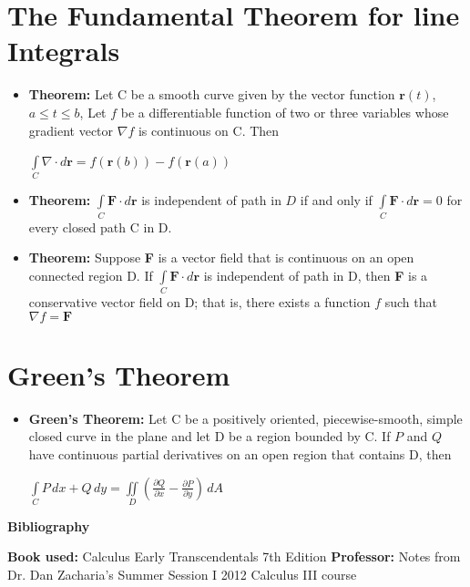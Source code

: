 \documentclass{report}
\begin{document}
	\section{The Fundamental Theorem for line Integrals}
		\begin{itemize}\addtolength{\leftskip}{2em}
			\item \textbf{Theorem:} Let C be a smooth curve given by the vector function $\textbf{r}(t)$, $a\le t \le b$, Let $f$ be a differentiable function of two or three variables whose gradient vector $\nabla f$ is continuous on C. Then
			\begin{center}
			$\int\limits_{C}^{}\nabla\cdot d\textbf{r}=f(\textbf{r}(b))-f(\textbf{r}(a))$
			\end{center}
			\item \textbf{Theorem:} $\int\limits_{C}^{}\textbf{F}\cdot d\textbf{r}$ is independent of path in $D$ if and only if $\int\limits_{C}^{}\textbf{F}\cdot d\textbf{r}=0$ for every closed path C in D.
			\item \textbf{Theorem:} Suppose \textbf{F} is a vector field that is continuous on an open connected region D. If $\int\limits_{C}^{}\textbf{F}\cdot d\textbf{r}$ is independent of path in D, then \textbf{F} is a conservative vector field on D;  that is, there exists a function $f$ such that $\nabla f=\textbf{F}$
		\end{itemize}
	\section{Green's Theorem}
		\begin{itemize}\addtolength{\leftskip}{2em}
			\item \textbf{Green's Theorem:} Let C be a positively oriented, piecewise-smooth, simple closed curve in the plane and let D be a region bounded by C. If $P$ and $Q$ have continuous partial derivatives on an open region that contains D, then
			\begin{center}
				\huge$\int\limits_{C}^{}P\,dx+Q\,dy=\iint\limits_{D}(\frac{\partial Q}{\partial x}-\frac{\partial P}{\partial y})\,dA$
			\end{center}
		\end{itemize}
	\begin{center}

	\vspace{45em}

	\textbf{\huge{Bibliography}}
	\end{center}
	\textbf{Book used:} Calculus Early Transcendentals 7th Edition\newline
	\textbf{Professor:} Notes from Dr. Dan Zacharia's Summer Session I 2012 Calculus III course
\end{document}
